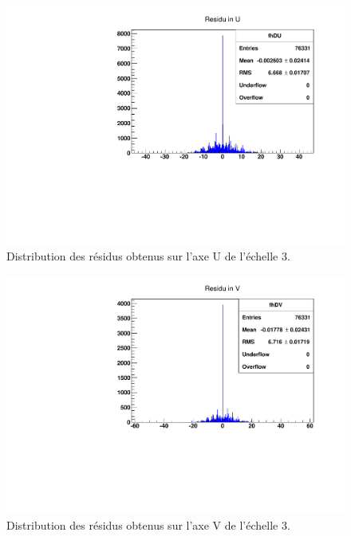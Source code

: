      \begin{figure}[!htb]
       \begin{center}
         \includegraphics[scale=0.60]{./figures/Residus_exemple/Residus_3Ladders/Residus_Du_ladder3-track_4pts_L1L2_2.pdf}
         \caption{Distribution des r\'esidus obtenus sur l'axe U de l'\'echelle 3.}
         \label{fig:ResU_PLUME_align_L3}
       \end{center}
    \end{figure}

    \begin{figure}[!htb]
       \begin{center}
         \includegraphics[scale=0.60]{./figures/Residus_exemple/Residus_3Ladders/Residus_Dv_ladder3-track_4pts_L1L2_2.pdf}
         \caption{Distribution des r\'esidus obtenus sur l'axe V de l'\'echelle 3.}
         \label{fig:ResV_PLUME_align_L3}
       \end{center}
    \end{figure}
  
